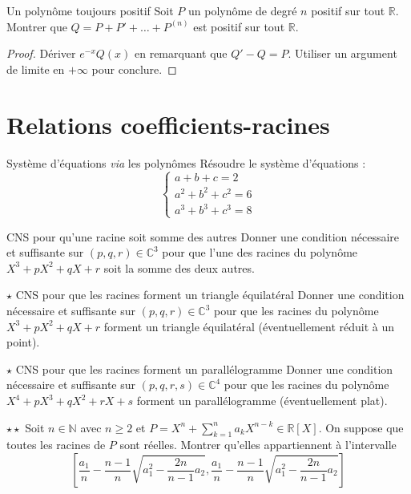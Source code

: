 \documentclass[french,a4paper]{article}
\newcommand{\N}{\mathbb{N}}
\newcommand{\R}{\mathbb{R}}
\newcommand{\C}{\mathbb{C}}
\theoremstyle{plain}
\theoremstyle{definition}
\theoremstyle{remark}
\begin{document}
\begin{ex}[Morlot]{Un polynôme toujours positif}
	Soit $P$ un polynôme de degré $n$ positif sur tout $\R$. Montrer que $Q=P+P'+\ldots+P^{(n)}$ est positif sur tout $\R$. 
\end{ex}
\begin{proof}
	Dériver $e^{-x}Q(x)$ en remarquant que $Q'-Q=P$. Utiliser un argument de limite en $+\infty$ pour conclure.
\end{proof}

\section{Relations coefficients-racines}

\begin{ex}[Moulin.07]{Système d'équations \textit{via} les polynômes}
	Résoudre le système d'équations : $$\begin{cases}
		a+b+c=2 \\
		a^2+b^2+c^2=6 \\
		a^3+b^3+c^3=8
	\end{cases}$$
\end{ex}

\begin{ex}[Moulin.08]{CNS pour qu'une racine soit somme des autres}
	Donner une condition nécessaire et suffisante sur $(p,q,r)\in\C^3$ pour que l'une des racines du polynôme $X^3+pX^2+qX+r$ soit la somme des deux autres.
\end{ex}

\begin{ex}[Moulin.09]{$\star$ CNS pour que les racines forment un triangle équilatéral}
	Donner une condition nécessaire et suffisante sur $(p,q,r)\in\C^3$ pour que les racines du polynôme $X^3+pX^2+qX+r$ forment un triangle équilatéral (éventuellement réduit à un point).
\end{ex}

\begin{ex}[Moulin.10]{$\star$ CNS pour que les racines forment un parallélogramme}
	Donner une condition nécessaire et suffisante sur $(p,q,r,s)\in\C^4$ pour que les racines du polynôme $X^4+pX^3+qX^2+rX+s$ forment un parallélogramme (éventuellement plat).
\end{ex}

\begin{ex}[Moulin.11]{$\star\star$}
	Soit $n\in\N$ avec $n\geqslant 2$ et $P=\displaystyle X^n+\sum_{k=1}^{n}a_kX^{n-k}\in\R[X]$. On suppose que toutes les racines de $P$ sont réelles. Montrer qu'elles appartiennent à l'intervalle $$\left[\frac{a_1}{n}-\frac{n-1}{n}\sqrt{a_1^2-\frac{2n}{n-1}a_2},\frac{a_1}{n}-\frac{n-1}{n}\sqrt{a_1^2-\frac{2n}{n-1}a_2}\right]$$
\end{ex}
\end{document}

